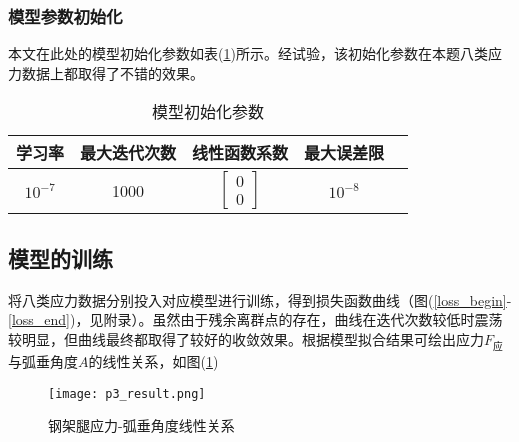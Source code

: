 \documentclass[withoutpreface,bwprint]{cumcmthesis}  %
\begin{document}
        \subsubsection{模型参数初始化}
        本文在此处的模型初始化参数如表(\ref{tab:model_param2})所示。经试验，该初始化参数在本题八类应力数据上都取得了不错的效果。
        \vspace{16pt}
        \begin{table}[h] 
            \centering
            \caption{模型初始化参数} 
            \begin{tabular}{ccccc}  
                \toprule  
                    学习率 & 最大迭代次数 & 线性函数系数 & 最大误差限\\  
                \midrule  
                    $10^{-7}$ & 1000 & $\begin{bmatrix}0\\0\end{bmatrix}$ & $10^{-8}$ \\ 
                \bottomrule
            \end{tabular}  
            \label{tab:model_param2}
        \end{table}
        
	\subsection{模型的训练}
        \label{model_train}
        将八类应力数据分别投入对应模型进行训练，得到损失函数曲线（图(\ref{loss_begin}-\ref{loss_end})，见附录）。虽然由于残余离群点的存在，曲线在迭代次数较低时震荡较明显，但曲线最终都取得了较好的收敛效果。根据模型拟合结果可绘出应力$F_{\text{应}}$与弧垂角度$A$的线性关系，如图(\ref{p3_result})
        \begin{figure}[H]
		\centering
		\texttt{[image: p3\_result.png]}
		\caption{钢架腿应力-弧垂角度线性关系}
		\label{p3_result}     %
	\end{figure}
	
\end{document}
